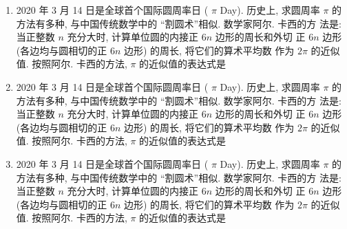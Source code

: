 \documentclass{ctexart}
\begin{document}
\begin{enumerate}
  \item 2020 年 3 月 14 日是全球首个国际圆周率日 ( $\pi$ Day). 历史上, 求圆周率 $\pi$ 的方法有多种, 与中国传统数学中的 “割圆术”相似. 数学家阿尔. 卡西的方 法是: 当正整数 $n$ 充分大时, 计算单位圆的内接正 $6 n$ 边形的周长和外切 正 $6 n$ 边形 (各边均与圆相切的正 $6 n$ 边形) 的周长, 将它们的算术平均数 作为 $2 \pi$ 的近似值. 按照阿尔. 卡西的方法, $\pi$ 的近似值的表达式是 \xparen

  \item 2020 年 3 月 14 日是全球首个国际圆周率日 ( $\pi$ Day). 历史上, 求圆周率 $\pi$ 的方法有多种, 与中国传统数学中的 “割圆术”相似. 数学家阿尔. 卡西的方 法是: 当正整数 $n$ 充分大时, 计算单位圆的内接正 $6 n$ 边形的周长和外切 正 $6 n$ 边形 (各边均与圆相切的正 $6 n$ 边形) 的周长, 将它们的算术平均数 作为 $2 \pi$ 的近似值. 按照阿尔. 卡西的方法, $\pi$ 的近似值的表达式是 \xparen

  \item 2020 年 3 月 14 日是全球首个国际圆周率日 ( $\pi$ Day). 历史上, 求圆周率 $\pi$ 的方法有多种, 与中国传统数学中的 “割圆术”相似. 数学家阿尔. 卡西的方 法是: 当正整数 $n$ 充分大时, 计算单位圆的内接正 $6 n$ 边形的周长和外切 正 $6 n$ 边形 (各边均与圆相切的正 $6 n$ 边形) 的周长, 将它们的算术平均数 作为 $2 \pi$ 的近似值. 按照阿尔. 卡西的方法, $\pi$ 的近似值的表达式是 \xparen


\end{enumerate}
\end{document}
